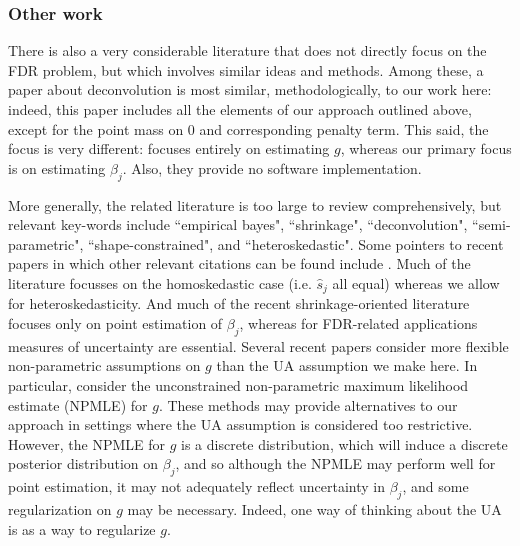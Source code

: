 \documentclass[11pt]{article}
\def\shat{\hat{s}}
\begin{document}
\subsubsection*{Other work}

There is also a very considerable literature that does not directly focus on the FDR problem, but which involves similar ideas and methods. 
 Among these, a paper about deconvolution \cite{cordy1997deconvolution} is most similar, methodologically, to our work here:
indeed, this paper includes all the elements of our approach outlined above, except for the point mass on 0 and corresponding penalty term.
This said, the focus is very different: \cite{cordy1997deconvolution} focuses entirely on estimating $g$, whereas our primary focus is on estimating $\beta_j$.
Also, they provide no software implementation.  

More generally, the related literature is too large to review comprehensively, but relevant key-words include ``empirical bayes", ``shrinkage", ``deconvolution", ``semi-parametric", ``shape-constrained", and ``heteroskedastic". Some pointers to recent papers in which other relevant
citations can be found include \cite{xie2012sure, sarkar:2014, koenker2014convex}. Much of the literature focusses on the homoskedastic case (i.e. $\shat_j$ all equal) whereas we allow for heteroskedasticity. And much of the recent shrinkage-oriented literature focuses only on point estimation of $\beta_j$, whereas for FDR-related applications measures of uncertainty are essential. Several recent papers consider more flexible non-parametric assumptions on 
$g$ than the UA assumption we make here. In particular, \cite{jiang2009general,koenker2014convex} consider the unconstrained non-parametric maximum likelihood
estimate (NPMLE) for $g$. These methods may provide alternatives to our approach in settings where the UA assumption is considered too restrictive. However, the  NPMLE for $g$ is a discrete distribution, which will induce a discrete posterior distribution on $\beta_j$, and so although the NPMLE
may perform well for point estimation, it may not adequately reflect uncertainty in $\beta_j$, and some regularization on $g$ may be necessary.
Indeed, one way of thinking about the UA is as a way to regularize $g$.
\end{document}
